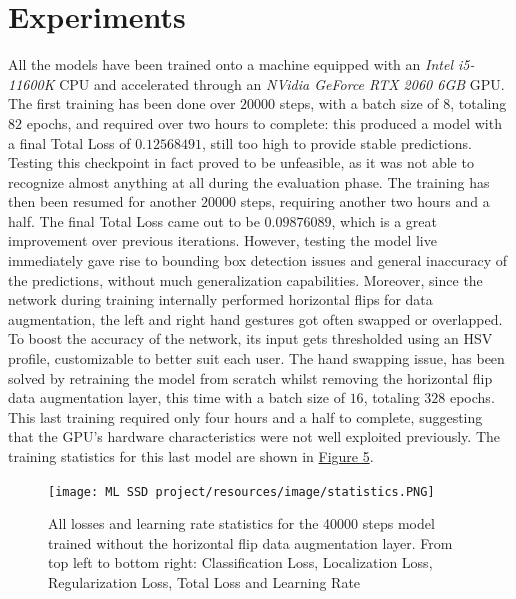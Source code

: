 \documentclass[10pt,twocolumn,letterpaper]{article}
\begin{document}
\section{Experiments}
\begin{flushleft}
All the models have been trained onto a machine equipped with an \textit{Intel i5-11600K} CPU and accelerated through an \textit{NVidia GeForce RTX 2060 6GB} GPU.
The first training has been done over $20000$ steps, with a batch size of $8$, totaling $82$ epochs, and required over two hours to complete: this produced a model with a final Total Loss of $0.12568491$, still too high to provide stable predictions. Testing this checkpoint in fact proved to be unfeasible, as it was not able to recognize almost anything at all during the evaluation phase.
The training has then been resumed for another $20000$ steps, requiring another two hours and a half. The final Total Loss came out to be $0.09876089$, which is a great improvement over previous iterations. However, testing the model live immediately gave rise to bounding box detection issues and general inaccuracy of the predictions, without much generalization capabilities. Moreover, since the network during training internally performed horizontal flips for data augmentation, the left and right hand gestures got often swapped or overlapped. To boost the accuracy of the network, its input gets thresholded using an HSV profile, customizable to better suit each user.
The hand swapping issue, has been solved by retraining the model from scratch whilst removing the horizontal flip data augmentation layer, this time with a batch size of $16$, totaling $328$ epochs. This last training required only four hours and a half to complete, suggesting that the GPU's hardware characteristics were not well exploited previously.
The training statistics for this last model are shown in \hyperref[figure5]{Figure 5}.

\begin{figure}[!h]
    \centering
    \texttt{[image: ML SSD project/resources/image/statistics.PNG]} \caption{All losses and learning rate statistics for the 40000 steps model trained without the horizontal flip data augmentation layer. From top left to bottom right: Classification Loss, Localization Loss, Regularization Loss, Total Loss and Learning Rate}
\end{figure}
\label{figure5}

\end{flushleft}
\end{document}
